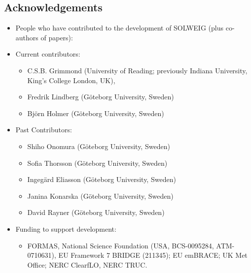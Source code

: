 \documentclass[letterpaper,10pt,english]{sphinxmanual}
\begin{document}
\subsection{Acknowledgements}
\label{\detokenize{OtherManuals/SOLWEIG:acknowledgements}}\begin{itemize}
\item {} 
People who have contributed to the development of SOLWEIG (plus
co-authors of papers):

\item {} 
Current contributors:
\begin{itemize}
\item {} 
C.S.B. Grimmond (University of Reading; previously Indiana
University, King’s College London, UK),

\item {} 
Fredrik Lindberg (Göteborg University, Sweden)

\item {} 
Björn Holmer (Göteborg University, Sweden)

\end{itemize}

\item {} 
Past Contributors:
\begin{itemize}
\item {} 
Shiho Onomura (Göteborg University, Sweden)

\item {} 
Sofia Thorsson (Göteborg University, Sweden)

\item {} 
Ingegärd Eliasson (Göteborg University, Sweden)

\item {} 
Janina Konarska (Göteborg University, Sweden)

\item {} 
David Rayner (Göteborg University, Sweden)

\end{itemize}

\item {} 
Funding to support development:
\begin{itemize}
\item {} 
FORMAS, National Science Foundation (USA, BCS-0095284,
ATM-0710631), EU Framework 7 BRIDGE (211345); EU emBRACE; UK Met
Office; NERC ClearfLO, NERC TRUC.

\end{itemize}

\end{itemize}
\end{document}
